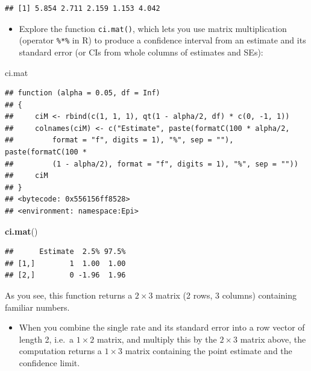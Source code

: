 \documentclass[
]{book}
\newenvironment{Shaded}{\begin{snugshade}}{\end{snugshade}}
\newcommand{\FunctionTok}[1]{\textcolor[rgb]{0.13,0.29,0.53}{\textbf{#1}}}
\newcommand{\NormalTok}[1]{#1}
\providecommand{\tightlist}{%
  \setlength{\itemsep}{0pt}\setlength{\parskip}{0pt}}
\theoremstyle{definition}
\theoremstyle{definition}
\theoremstyle{definition}
\theoremstyle{definition}
\theoremstyle{remark}
\begin{document}
\begin{verbatim}
## [1] 5.854 2.711 2.159 1.153 4.042
\end{verbatim}

\begin{itemize}
\tightlist
\item
  Explore the function \texttt{ci.mat()}, which lets you use
  matrix multiplication (operator \texttt{\textquotesingle{}\%*\%\textquotesingle{}}
  in R) to produce a confidence interval from an estimate and its
  standard error (or CIs from whole columns of estimates and SEs):
\end{itemize}

\begin{Shaded}
\begin{Highlighting}[]
\NormalTok{ci.mat}
\end{Highlighting}
\end{Shaded}

\begin{verbatim}
## function (alpha = 0.05, df = Inf) 
## {
##     ciM <- rbind(c(1, 1, 1), qt(1 - alpha/2, df) * c(0, -1, 1))
##     colnames(ciM) <- c("Estimate", paste(formatC(100 * alpha/2, 
##         format = "f", digits = 1), "%", sep = ""), paste(formatC(100 * 
##         (1 - alpha/2), format = "f", digits = 1), "%", sep = ""))
##     ciM
## }
## <bytecode: 0x556156ff8528>
## <environment: namespace:Epi>
\end{verbatim}

\begin{Shaded}
\begin{Highlighting}[]
\FunctionTok{ci.mat}\NormalTok{()}
\end{Highlighting}
\end{Shaded}

\begin{verbatim}
##      Estimate  2.5% 97.5%
## [1,]        1  1.00  1.00
## [2,]        0 -1.96  1.96
\end{verbatim}

As you see, this function returns a \(2\times 3\) matrix (2 rows, 3 columns) containing familiar numbers.

\begin{itemize}
\tightlist
\item
  When you combine the single rate and its standard error into
  a row vector of length 2, i.e.~a \(1\times 2\) matrix, and multiply this
  by the \(2\times 3\) matrix above, the computation returns
  a \(1\times 3\) matrix containing the point estimate and the
  confidence limit.
\end{itemize}
\end{document}
